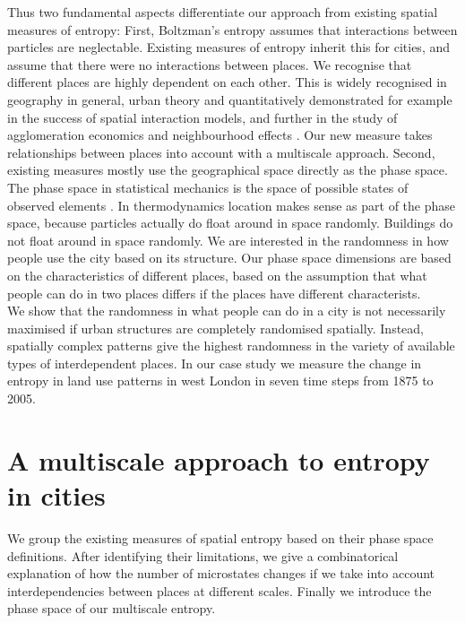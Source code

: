 \documentclass[fleqn,10pt]{wlscirep}
\begin{document}
Thus two fundamental aspects differentiate our approach from existing spatial measures of entropy:
First, Boltzman's entropy assumes that interactions between particles are neglectable. Existing measures of entropy inherit this for cities, and assume that there were no interactions between places. We recognise that different places are highly dependent on each other. This is widely recognised in geography in general\cite{Tobler1970}, urban theory\cite{Jane,NotATree} and quantitatively demonstrated for example in the success of spatial interaction models\cite{WilsonFamily,SpatialInteraction1,GisModels,WilsonSIMretail}, and further in the study of agglomeration economics \cite{agglomerationEconomics} and neighbourhood effects \cite{neighbourhoodeffects}. Our new measure takes relationships between places into account with a multiscale approach.\newline
Second, existing measures mostly use the geographical space directly as the phase space. The phase space in statistical mechanics is the space of possible states of observed elements \cite{GeneralPropertiesOfEntropy}. In thermodynamics location makes sense as part of the phase space, because particles actually do float around in space randomly. Buildings do not float around in space randomly. We are interested in the randomness in how people use the city based on its structure. Our phase space dimensions are based on the characteristics of different places, based on the assumption that what people can do in two places differs if the places have different characterists.\\

We show that the randomness in what people can do in a city is not necessarily maximised if urban structures are completely randomised spatially. Instead, spatially complex patterns give the highest randomness in the variety of available types of interdependent places. In our case study we measure the change in entropy in land use patterns in west London in seven time steps from 1875 to 2005.


\section*{A multiscale approach to entropy in cities}
We group the existing measures of spatial entropy based on their phase space definitions. After identifying their limitations, we give a combinatorical explanation of how the number of microstates changes if we take into account interdependencies between places at different scales. Finally we introduce the phase space of our multiscale entropy.  
\end{document}
